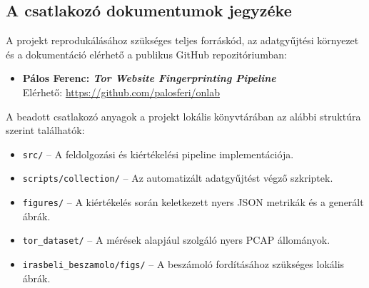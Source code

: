 \documentclass[a4paper,oneside]{article}
\begin{document}
\subsection{A csatlakozó dokumentumok jegyzéke}
\label{sec:csat-irod}

A projekt reprodukálásához szükséges teljes forráskód, az adatgyűjtési környezet és a dokumentáció elérhető a publikus GitHub repozitóriumban:
\begin{itemize}
    \item[] \textbf{Pálos Ferenc: \textit{Tor Website Fingerprinting Pipeline}} \\
    Elérhető: \url{https://github.com/palosferi/onlab}
\end{itemize}

A beadott csatlakozó anyagok a projekt lokális könyvtárában az alábbi struktúra szerint találhatók:
\begin{itemize}
    \item \texttt{src/} -- A feldolgozási és kiértékelési pipeline implementációja.
\item \texttt{scripts/collection/} -- Az automatizált adatgyűjtést végző szkriptek.
    \item \texttt{figures/} -- A kiértékelés során keletkezett nyers JSON metrikák és a generált ábrák.
\item \texttt{tor\_dataset/} -- A mérések alapjául szolgáló nyers PCAP állományok.
    \item \texttt{irasbeli\_beszamolo/figs/} -- A beszámoló fordításához szükséges lokális ábrák.
\end{itemize}
\end{document}
